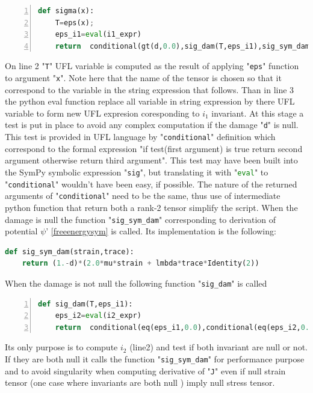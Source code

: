 \documentclass[12pt]{article}
\newcommand{\mycodepy}[1]{\textsf{"}\lstinline[language=Python]`#1`\textsf{"}}
\begin{document}
\begin{lstlisting}[numbers=left,basicstyle=\footnotesize,language=python]
def sigma(x): 
	T=eps(x);
	eps_i1=eval(i1_expr)
	return  conditional(gt(d,0.0),sig_dam(T,eps_i1),sig_sym_dam(T,eps_i1))
\end{lstlisting} 
On line 2 \mycodepy{T} UFL variable is computed as the result of applying \mycodepy{eps} function to argument \mycodepy{x}. Note here that the name of the tensor is chosen so that it correspond to the variable in the string expression that follows. Than in line 3  the python eval function replace all variable in string expression by there UFL variable to form new UFL expresion coresponding to $i_1$ invariant. At this stage a test is put in place to avoid any complex computation if the damage \mycodepy{d} is null. This test is provided in UFL language by \mycodepy{conditional} definition which correspond to the formal expression "if test(first argument) is true return second argument otherwise return third argument". This test may have been built into the SymPy symbolic expression \mycodepy{sig}, but translating it with \mycodepy{eval} to \mycodepy{conditional} wouldn't have been easy, if possible. The nature of the returned arguments of \mycodepy{conditional}  need to be the same, thus use of intermediate python function that return both a rank-2 tensor simplify the script.
When the damage is null the function \mycodepy{sig_sym_dam} corresponding to derivation of potential $\psi$' \eqref{freeenergysym} is called. Its implementation is the following:
\begin{lstlisting}[numbers=none,basicstyle=\footnotesize,language=python]
def sig_sym_dam(strain,trace): 
	return (1.-d)*(2.0*mu*strain + lmbda*trace*Identity(2))	
\end{lstlisting}

When the damage is not null the following function \mycodepy{sig_dam} is called
\begin{lstlisting}[numbers=left,basicstyle=\footnotesize,language=python]
def sig_dam(T,eps_i1):
	eps_i2=eval(i2_expr)
	return  conditional(eq(eps_i1,0.0),conditional(eq(eps_i2,0.0),sig_sym_dam(T,eps_i1),sigma_strain_not_nul(T,eps_i1)),sigma_strain_not_nul(T,eps_i1))
\end{lstlisting} 
Its only purpose is to compute $i_2$ (line2) and test if both invariant are null or not. If they are both null it calls the function \mycodepy{sig_sym_dam} for performance purpose  and to avoid singularity when computing derivative of \mycodepy{J} even if null strain tensor (one case where invariants are both null ) imply null stress tensor.
\end{document}
